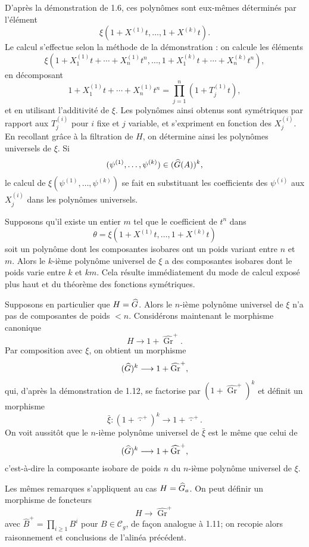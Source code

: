 \documentclass[11pt]{article}
\begin{document}
D'après la démonstration de 1.6, ces polynômes sont eux-mêmes déterminés par l'élément
\[
  \xi(1+X^{(1)}t,\ldots,1+X^{(k)}t).
\]
Le calcul s'effectue selon la méthode de la démonstration : on calcule les éléments
\[
  \xi(1+X_1^{(1)}t+\cdots+X_n^{(1)}t^n,\ldots,
  1+X_1^{(k)}t+\cdots+X_n^{(k)}t^n),
\]
en décomposant
\[
  1+X_1^{(1)}t+\cdots+X_n^{(1)}t^n
  =
  \prod_{j=1}^{n}(1+T_j^{(1)}t),
\]
et en utilisant l'additivité de \(\xi\). Les polynômes ainsi obtenus sont symétriques par rapport aux \(T_j^{(i)}\) pour \(i\) fixe et \(j\) variable, et s'expriment en fonction des \(X_j^{(i)}\). En recollant grâce à la filtration de \(H\), on détermine ainsi les polynômes universels de \(\xi\). Si
\[
  (\psi^{(1)},\ldots,\psi^{(k)})\in(\widehat G(A))^k,
\]
le calcul de \(\xi(\psi^{(1)},\ldots,\psi^{(k)})\) se fait en substituant les coefficients des \(\psi^{(i)}\) aux \(X_j^{(i)}\) dans les polynômes universels.

Supposons qu'il existe un entier \(m\) tel que le coefficient de \(t^n\) dans
\[
  \theta=\xi(1+X^{(1)}t,\ldots,1+X^{(k)}t)
\]
soit un polynôme dont les composantes isobares ont un poids variant entre \(n\) et \(m\). Alors le \(k\)-ième polynôme universel de \(\xi\) a des composantes isobares dont le poids varie entre \(k\) et \(km\). Cela résulte immédiatement du mode de calcul exposé plus haut et du théorème des fonctions symétriques.

Supposons en particulier que \(H=\widehat G\). Alors le \(n\)-ième polynôme universel de \(\xi\) n'a pas de composantes de poids \(<n\). Considérons maintenant le morphisme canonique
\[
  H\longrightarrow1+\widehat{\operatorname{Gr}}^{+}.
\]
Par composition avec \(\xi\), on obtient un morphisme
\[
  (\widehat G)^k\longrightarrow1+\widehat{\operatorname{Gr}}^{+},
\]
qui, d'après la démonstration de 1.12, se factorise par \((1+\widehat{\operatorname{Gr}}^{+})^k\) et définit un morphisme
\[
  \bar\xi:(1+\widehat{\,\cdot\,}^{+})^k\longrightarrow1+\widehat{\,\cdot\,}^{+}.
\]
On voit aussitôt que le \(n\)-ième polynôme universel de \(\bar\xi\) est le même que celui de
\[
  (\widehat G)^k\longrightarrow1+\widehat{\operatorname{Gr}}^{+},
\]
c'est-à-dire la composante isobare de poids \(n\) du \(n\)-ième polynôme universel de \(\xi\).

Les mêmes remarques s'appliquent au cas \(H=\widehat G_a\). On peut définir un morphisme de foncteurs
\[
  H\longrightarrow\widehat{\operatorname{Gr}}^{+}
\]
avec \(\widehat B^+=\prod_{i\geq1}B^i\) pour \(B\in\mathcal C_g\), de façon analogue à 1.11; on recopie alors raisonnement et conclusions de l'alinéa précédent.
\end{document}
